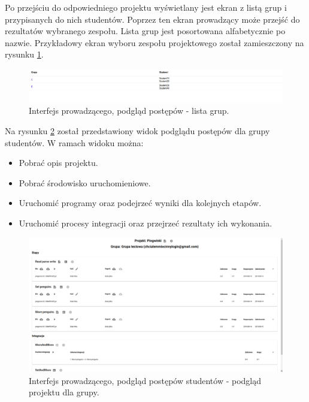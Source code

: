 Po przejściu do odpowiedniego projektu wyświetlany jest ekran z listą grup i przypisanych do nich studentów.
Poprzez ten ekran prowadzący może przejść do rezultatów wybranego zespołu.
Lista grup jest posortowana alfabetycznie po nazwie.
Przykładowy ekran wyboru zespołu projektowego został zamieszczony na rysunku \ref{fig:lecturer_preview_groups}.

\begin{figure}[h]
    \centering
    \includegraphics[width = 13cm]{chapter04/lecturer_preview_groups.png}
    \caption{Interfejs prowadzącego, podgląd postępów - lista grup.}
    \label{fig:lecturer_preview_groups}
\end{figure}

Na rysunku \ref{fig:lecturer-interface-preview} został przedstawiony widok podglądu postępów dla grupy studentów.
W ramach widoku można:
\begin{itemize}
    \item Pobrać opis projektu.
    \item Pobrać środowisko uruchomieniowe.
    \item Uruchomić programy oraz podejrzeć wyniki dla kolejnych etapów.
    \item Uruchomić procesy integracji oraz przejrzeć rezultaty ich wykonania.
\end{itemize}

\begin{figure}[h]
    \centering
    \includegraphics[width = 13cm]{chapter04/lecturer_interface_preview.png}
    \caption{Interfejs prowadzącego, podgląd postępów studentów - podgląd projektu dla grupy.}
    \label{fig:lecturer-interface-preview}
\end{figure}


